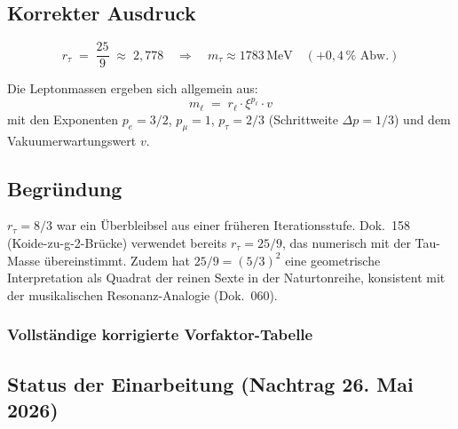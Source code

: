 \subsection*{Korrekter Ausdruck}

\begin{equation}
  \boxed{r_\tau \;=\; \frac{25}{9} \;\approx\; 2{,}778}
  \quad \Rightarrow \quad
  m_\tau \approx 1783\,\text{MeV} \quad (+0{,}4\,\% \text{ Abw.})
  \tag{190.2}
\end{equation}

Die Leptonmassen ergeben sich allgemein aus:
\begin{equation}
  m_\ell \;=\; r_\ell \cdot \xi^{p_\ell} \cdot v
  \tag{190.3}
\end{equation}
mit den Exponenten $p_e = 3/2$, $p_\mu = 1$, $p_\tau = 2/3$
(Schrittweite $\Delta p = 1/3$) und dem Vakuumerwartungswert $v$.

\subsection*{Begründung}

$r_\tau = 8/3$ war ein Überbleibsel aus einer früheren Iterationsstufe.
Dok.~158 (Koide-zu-g-2-Brücke) verwendet bereits $r_\tau = 25/9$, das
numerisch mit der Tau-Masse übereinstimmt. Zudem hat $25/9 = (5/3)^2$
eine geometrische Interpretation als Quadrat der reinen Sexte in der
Naturtonreihe, konsistent mit der musikalischen Resonanz-Analogie
(Dok.~060).

\subsubsection*{Vollständige korrigierte Vorfaktor-Tabelle}

\begin{center}
{\footnotesize
{}
} %
\end{center}

\subsection*{Status der Einarbeitung (Nachtrag 26. Mai 2026)}

